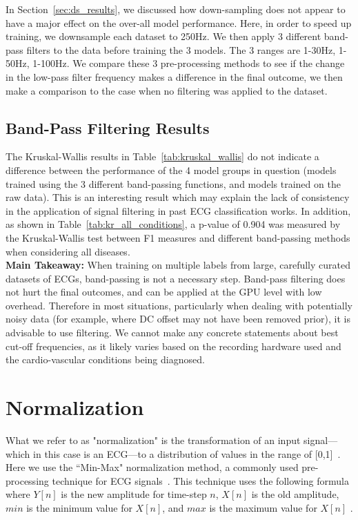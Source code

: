 \documentclass[pmlr,twocolumn]{jmlr}%
\begin{document}
In Section~\ref{sec:ds_results}, we discussed how down-sampling does not appear to have a major effect on the over-all model performance. Here, in order to speed up training, we downsample each dataset to 250Hz. We then apply 3 different band-pass filters to the data before training the 3 models. The 3 ranges are 1-30Hz, 1-50Hz, 1-100Hz. We compare these 3 pre-processing methods to see if the change in the low-pass filter frequency makes a difference in the final outcome, we then make a comparison to the case when no filtering was applied to the dataset. 

\subsection{Band-Pass Filtering Results}
The Kruskal-Wallis results in Table~\ref{tab:kruskal_wallis} do not indicate a difference between the performance of the 4 model groups in question (models trained using the 3 different band-passing functions, and models trained on the raw data). This is an interesting result which may explain the lack of consistency in the application of signal filtering in past ECG classification works. In addition, as shown in Table~\ref{tab:kr_all_conditions}, a p-value of 0.904 was measured by the Kruskal-Wallis test between F1 measures and different band-passing methods when considering all diseases. 
\\
\textbf{Main Takeaway:} When training on multiple labels from large, carefully curated datasets of ECGs, band-passing is not a necessary step. Band-pass filtering does not hurt the final outcomes, and can be applied at the GPU level with low overhead. Therefore in most situations, particularly when dealing with potentially noisy data (for example, where DC offset may not have been removed prior), it is advisable to use filtering. We cannot make any concrete statements about best cut-off frequencies, as it likely varies based on the recording hardware used and the cardio-vascular conditions being diagnosed. 

\section{Normalization}
\label{sec:Norm}
What we refer to as "normalization" is the transformation of an input signal---which in this case is an ECG---to a distribution of values in the range of [0,1]~\citep{hong2022practical}. Here we use the ``Min-Max" normalization method, a commonly used pre-processing technique for ECG signals~\citep{uwaechia2021comprehensive,li2010robust,li2019identifying,fang2009human}. This technique uses the following formula where $Y[n]$ is the new amplitude for time-step $n$, $X[n]$ is the old amplitude, $min$ is the minimum value for $X[n]$, and $max$ is the maximum value for $X[n]$ \citep{uwaechia2021comprehensive}.
\end{document}
